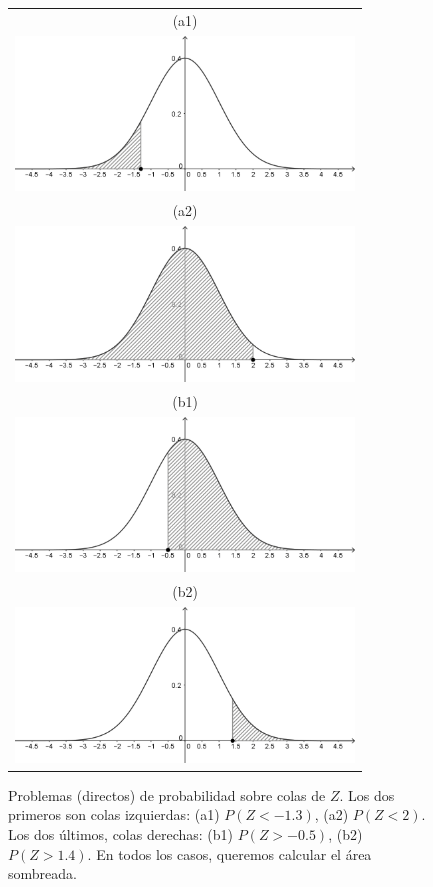 \begin{figure}[p]
\begin{center}
\begin{enColor}
\end{enColor}
\begin{bn}
\begin{tabular}{c}
(a1)\\
\includegraphics[width=9cm]{../fig/Cap06-ColaIzquierdaZ-01-bn.png}\\
(a2)\\
\includegraphics[width=9cm]{../fig/Cap06-ColaIzquierdaZ-02-bn.png}\\
(b1)\\
\includegraphics[width=9cm]{../fig/Cap06-ColaDerechaZ-01-bn.png}\\
(b2)\\
\includegraphics[width=9cm]{../fig/Cap06-ColaDerechaZ-02-bn.png}\\
\end{tabular}
\end{bn}
\caption{Problemas (directos) de probabilidad sobre colas de $Z$.
Los dos primeros son colas izquierdas: (a1) $P(Z<-1.3)$, (a2) $P(Z<2)$. Los dos últimos, colas derechas: (b1) $P(Z>-0.5)$, (b2) $P(Z>1.4)$. En todos los casos, queremos calcular el área sombreada.
}
\label{cap06:fig:ProblemasColasZ}
\end{center}
\end{figure}

